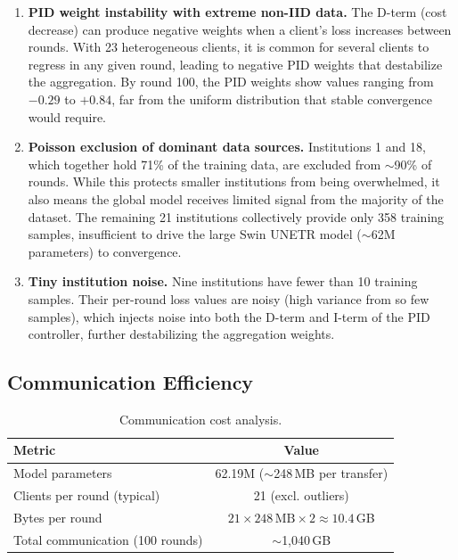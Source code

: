 \documentclass{article}
\begin{document}
\begin{enumerate}
    \item \textbf{PID weight instability with extreme non-IID data.} The D-term (cost decrease) can produce negative weights when a client's loss increases between rounds. With 23 heterogeneous clients, it is common for several clients to regress in any given round, leading to negative PID weights that destabilize the aggregation. By round 100, the PID weights show values ranging from $-0.29$ to $+0.84$, far from the uniform distribution that stable convergence would require.

    \item \textbf{Poisson exclusion of dominant data sources.} Institutions 1 and 18, which together hold 71\% of the training data, are excluded from $\sim$90\% of rounds. While this protects smaller institutions from being overwhelmed, it also means the global model receives limited signal from the majority of the dataset. The remaining 21 institutions collectively provide only 358 training samples, insufficient to drive the large Swin UNETR model ($\sim$62M parameters) to convergence.

    \item \textbf{Tiny institution noise.} Nine institutions have fewer than 10 training samples. Their per-round loss values are noisy (high variance from so few samples), which injects noise into both the D-term and I-term of the PID controller, further destabilizing the aggregation weights.
\end{enumerate}

\subsection{Communication Efficiency}

\begin{table}[h]
\centering
\begin{tabular}{lc}
\toprule
\textbf{Metric} & \textbf{Value} \\
\midrule
Model parameters & 62.19M ($\sim$248\,MB per transfer) \\
Clients per round (typical) & 21 (excl. outliers) \\
Bytes per round & $21 \times 248\,\text{MB} \times 2 \approx 10.4$\,GB \\
Total communication (100 rounds) & $\sim$1,040\,GB \\
\bottomrule
\end{tabular}
\caption{Communication cost analysis.}
\label{tab:comm}
\end{table}
\end{document}
